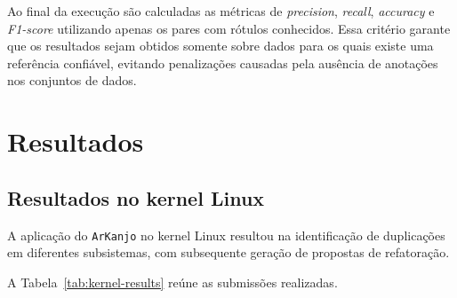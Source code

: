 \documentclass[twocolumn]{article}
\begin{document}

Ao final da execução são calculadas as métricas de \textit{precision}, \textit{recall}, \textit{accuracy} e \textit{F1-score} utilizando apenas os pares com rótulos conhecidos. Essa critério garante que os resultados sejam obtidos somente sobre dados para os quais existe uma referência confiável, evitando penalizações causadas pela ausência de anotações nos conjuntos de dados.

\section{Resultados}

\subsection{Resultados no kernel Linux}

A aplicação do \texttt{ArKanjo} no kernel Linux resultou na identificação de duplicações em diferentes subsistemas, com subsequente geração de propostas de refatoração.

A Tabela~\ref{tab:kernel-results} reúne as submissões realizadas.

\def\AMD{AMD}
\def\IIO{IIO}
\end{document}

